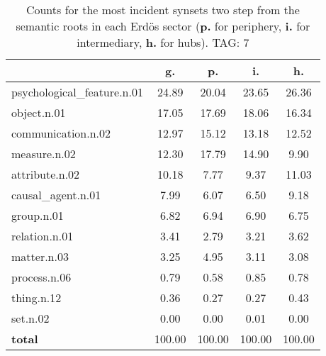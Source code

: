 \begin{table}[h!]
\begin{center}
\begin{tabular}{| l | c | c | c | c |}\hline
 & g. & p. & i. & h. \\\hline
psychological\_feature.n.01 & 24.89  & 20.04  & 23.65  & 26.36 \\\hline
object.n.01 & 17.05  & 17.69  & 18.06  & 16.34 \\\hline
communication.n.02 & 12.97  & 15.12  & 13.18  & 12.52 \\\hline
measure.n.02 & 12.30  & 17.79  & 14.90  & 9.90 \\\hline
attribute.n.02 & 10.18  & 7.77  & 9.37  & 11.03 \\\hline
causal\_agent.n.01 & 7.99  & 6.07  & 6.50  & 9.18 \\\hline
group.n.01 & 6.82  & 6.94  & 6.90  & 6.75 \\\hline
relation.n.01 & 3.41  & 2.79  & 3.21  & 3.62 \\\hline
matter.n.03 & 3.25  & 4.95  & 3.11  & 3.08 \\\hline
process.n.06 & 0.79  & 0.58  & 0.85  & 0.78 \\\hline
thing.n.12 & 0.36  & 0.27  & 0.27  & 0.43 \\\hline
set.n.02 & 0.00  & 0.00  & 0.01  & 0.00 \\\hline
{{\bf total}} & 100.00  & 100.00  & 100.00  & 100.00 \\\hline
\end{tabular}
\caption{Counts for the most incident synsets two step from the semantic roots in each Erd\"os sector ({\bf p.} for periphery, {\bf i.} for intermediary, {\bf h.} for hubs). TAG: 7}
\end{center}
\end{table}